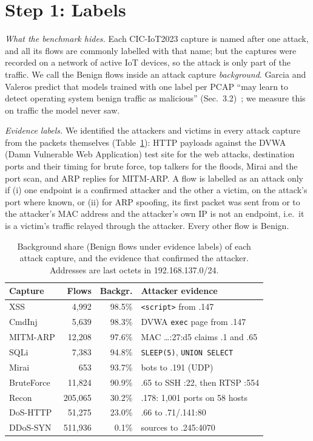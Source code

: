 \section{Step 1: Labels}\label{sec:labels}

\emph{What the benchmark hides.} Each CIC-IoT2023 capture is named after one attack, and all its flows are commonly labelled with that name; but the captures were recorded on a network of active IoT devices, so the attack is only part of the traffic. We call the Benign flows inside an attack capture \emph{background}. Garcia and Valeros predict that models trained with one label per PCAP ``may learn to detect operating system benign traffic as malicious'' (Sec.~3.2)~\cite{garcia2023labeling}; we measure this on traffic the model never saw.

\emph{Evidence labels.} We identified the attackers and victims in every attack capture from the packets themselves (Table~\ref{tab:background}): HTTP payloads against the DVWA (Damn Vulnerable Web Application) test site for the web attacks, destination ports and their timing for brute force, top talkers for the floods, Mirai and the port scan, and ARP replies for MITM-ARP. A flow is labelled as an attack only if (i) one endpoint is a confirmed attacker and the other a victim, on the attack's port where known, or (ii) for ARP spoofing, its first packet was sent from or to the attacker's MAC address and the attacker's own IP is not an endpoint, i.e.\ it is a victim's traffic relayed through the attacker. Every other flow is Benign.

\begin{table}[t]
\centering
\caption{Background share (Benign flows under evidence labels) of each attack capture, and the evidence that confirmed the attacker. Addresses are last octets in 192.168.137.0/24.}
\label{tab:background}
\footnotesize
\setlength{\tabcolsep}{3pt}
\begin{tabular}{lrr>{\raggedright\arraybackslash}p{3.85cm}}
\hline
Capture & Flows & Backgr. & Attacker evidence \\
\hline
XSS          &   4,992 & 98.5\% & \texttt{<script>} from .147 \\
CmdInj       &   5,639 & 98.3\% & DVWA \texttt{exec} page from .147 \\
MITM-ARP     &  12,208 & 97.6\% & MAC \ldots:27:d5 claims .1 and .65 \\
SQLi         &   7,383 & 94.8\% & \texttt{SLEEP(5)}, \texttt{UNION SELECT} \\
Mirai        &     653 & 93.7\% & 7 bots to .191 (UDP) \\
BruteForce   &  11,824 & 90.9\% & .65 to SSH :22, then RTSP :554 \\
Recon        & 205,065 & 30.2\% & .178: 1,001 ports on 58 hosts \\
DoS-HTTP     &  51,275 & 23.0\% & .66 to .71/.141:80 \\
DDoS-SYN     & 511,936 &  0.1\% & 6 sources to .245:4070 \\
\hline
\end{tabular}
\end{table}

